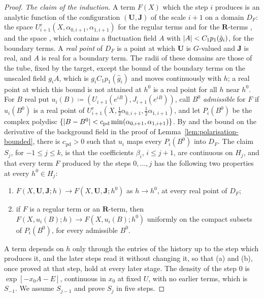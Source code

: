 \documentclass[11pt]{preprint}
\DeclarePairedDelimiter{\abs}{\lvert}{\rvert}
\numberwithin{equation}{section}
\theoremstyle{definition}
\theoremstyle{remark}
\theoremstyle{plain}
\begin{document}
\begin{proof}
\emph{The claim of the induction.} A term $F(X)$ which the step $i$ produces is an analytic function of the configuration $(\mathbf U, \mathbf J)$ of the scale $i + 1$ on a domain $D_F$: the space $U^c_{i+1}(X, \alpha_{0,i+1}, \alpha_{1,i+1})$ for the regular terms \cite[(2.26)--(2.28), p.~259]{BalabanCRE} and for the $\mathbf R$-terms \cite[(2.31), p.~260]{BalabanCRE}, and the space \cite[(3.43), p.~276]{BalabanCRE}, which contains a fluctuation field $A$ with $\abs{A} < C_1p_1(\hat g_i)$, for the boundary terms. A \emph{real point} of $D_F$ is a point at which $\mathbf U$ is $G$-valued and $\mathbf J$ is real, and $A$ is real for a boundary term. The radii of these domains are those of the tube, fixed by the target, except the bound of the boundary terms on the unscaled field $g_iA$, which is $g_iC_1p_1(\hat g_i)$ and moves continuously with $h$; a real point at which this bound is not attained at $h^0$ is a real point for all $h$ near $h^0$. For $B$ real put $u_i(B) \coloneqq (U_{i+1}(e^{iB}), J_{i+1}(e^{iB}))$, call $B^0$ \emph{admissible} for $F$ if $u_i(B^0)$ is a real point of $U^c_{i+1}(X, \frac12\alpha_{0,i+1}, \frac12\alpha_{1,i+1})$, and let $P_i(B^0)$ be the complex polydisc $\{ \abs{B - B^0} < c_{\mathrm{pd}}\min(\alpha_{0,i+1}, \alpha_{1,i+1}) \}$. By \cite[(1.15), (1.16), p.~262]{BalabanRG1} and the bound on the derivative of the background field in the proof of Lemma~\ref{lem:polarisation-bounded}, there is $c_{\mathrm{pd}} > 0$ such that $u_i$ maps every $P_i(B^0)$ into $D_F$. The claim $S_j$, for $-1 \leq j \leq k$, is that the coefficients $\beta_i$, $i \leq j + 1$, are continuous on $H_j$, and that every term $F$ produced by the steps $0, \dots, j$ has the following two properties at every $h^0 \in H_j$:
\begin{enumerate}[label=(\alph*)]
\item $F(X, \mathbf U, \mathbf J; h) \to F(X, \mathbf U, \mathbf J; h^0)$ as $h \to h^0$, at every real point of $D_F$;
\item if $F$ is a regular term or an $\mathbf R$-term, then $F(X, u_i(B); h) \to F(X, u_i(B); h^0)$ uniformly on the compact subsets of $P_i(B^0)$, for every admissible $B^0$.
\end{enumerate}
A term depends on $h$ only through the entries of the history up to the step which produces it, and the later steps read it without changing it, so that (a) and (b), once proved at that step, hold at every later stage. The density of the step $0$ is $\exp[-x_0A - E]$, continuous in $x_0$ at fixed $U$, with no earlier terms, which is $S_{-1}$. We assume $S_{j-1}$ and prove $S_j$ in five steps.


\end{proof}
\end{document}
